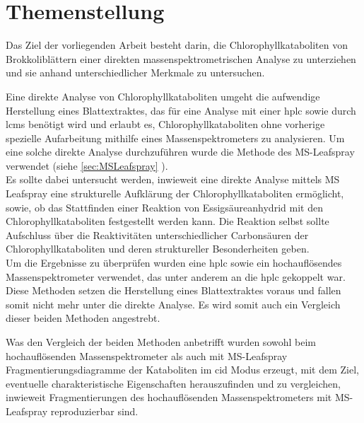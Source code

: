 \chapter{Themenstellung}

Das Ziel der vorliegenden Arbeit besteht darin, die Chlorophyllkataboliten von Brokkoliblättern einer direkten massenspektrometrischen Analyse zu unterziehen und sie anhand unterschiedlicher Merkmale zu untersuchen.

Eine direkte Analyse von Chlorophyllkataboliten umgeht die aufwendige Herstellung eines Blattextraktes, das für eine Analyse mit einer \gls{hplc} sowie durch \gls{lcms} benötigt wird und erlaubt es, Chlorophyllkataboliten ohne vorherige spezielle Aufarbeitung mithilfe eines Massenspektrometers zu analysieren. \cite{DirectPlantTissue} Um eine solche direkte Analyse durchzuführen wurde die Methode des MS-Leafspray \cite{LeafSpray} verwendet (siehe \ref{sec:MSLeafspray} ). \\

Es sollte dabei untersucht werden, inwieweit eine direkte Analyse mittels MS Leafspray eine strukturelle Aufklärung der Chlorophyllkataboliten ermöglicht, sowie, ob das Stattfinden einer Reaktion von Essigsäureanhydrid mit den Chlorophyllkataboliten festgestellt werden kann. Die Reaktion selbst sollte Aufschluss über die Reaktivitäten unterschiedlicher Carbonsäuren der Chlorophyllkataboliten und deren struktureller Besonderheiten geben. \\

Um die Ergebnisse zu überprüfen wurden eine \gls{hplc} sowie ein hochauflösendes Massenspektrometer verwendet, das unter anderem an die \gls{hplc} gekoppelt war. Diese Methoden setzen die Herstellung eines Blattextraktes voraus und fallen somit nicht mehr unter die direkte Analyse. Es wird somit auch ein Vergleich dieser beiden Methoden angestrebt. 

Was den Vergleich der beiden Methoden anbetrifft wurden sowohl beim hochauflösenden Massenspektrometer als auch mit MS-Leafspray Fragmentierungsdiagramme der Kataboliten im \gls{cid} Modus erzeugt, mit dem Ziel, eventuelle charakteristische Eigenschaften herauszufinden und zu vergleichen, inwieweit Fragmentierungen des hochauflösenden Massenspektrometers mit MS-Leafspray reproduzierbar sind. 




